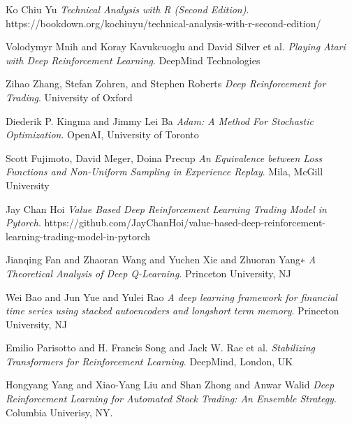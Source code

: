 \documentclass[10pt,twocolumn,letterpaper]{article}
\begin{document}
{\small


}

\begin{thebibliography}{9}

Ko Chiu Yu
\textit{Technical Analysis with R (Second Edition)}. 
https://bookdown.org/kochiuyu/technical-analysis-with-r-second-edition/

Volodymyr Mnih and Koray Kavukcuoglu and David Silver et al.
\textit{Playing Atari with Deep Reinforcement Learning}. 
DeepMind Technologies

Zihao Zhang, Stefan Zohren, and Stephen Roberts
\textit{Deep Reinforcement for Trading}. 
University of Oxford

Diederik P. Kingma and Jimmy Lei Ba
\textit{Adam: A Method For Stochastic Optimization}. 
OpenAI, University of Toronto

Scott Fujimoto, David Meger, Doina Precup
\textit{An Equivalence between Loss Functions and Non-Uniform Sampling in Experience Replay}. 
Mila, McGill University

Jay Chan Hoi
\textit{Value Based Deep Reinforcement Learning Trading Model in Pytorch}. 
https://github.com/JayChanHoi/value-based-deep-reinforcement-learning-trading-model-in-pytorch

Jianqing Fan and Zhaoran Wang and Yuchen Xie and Zhuoran Yang∗
\textit{A Theoretical Analysis of Deep Q-Learning}. 
Princeton University, NJ

Wei Bao and Jun Yue and Yulei Rao
\textit{A deep learning framework for financial time series using stacked autoencoders and longshort term memory}.
Princeton University, NJ

Emilio Parisotto and H. Francis Song and Jack W. Rae et al.
\textit{Stabilizing Transformers for Reinforcement Learning}.
DeepMind, London, UK

Hongyang Yang and Xiao-Yang Liu and Shan Zhong and Anwar Walid
\textit{Deep Reinforcement Learning for Automated Stock Trading: An Ensemble Strategy}.
Columbia Univerisy, NY.

\end{thebibliography}
\end{document}
